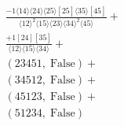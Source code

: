 \documentclass[varwidth, border=5pt]{standalone}
\begin{document}
\begin{my}
$\begin{gathered}
\scriptscriptstyle\frac{-1⟨14⟩⟨24⟩⟨25⟩[25]⟨35⟩[45]}{⟨12⟩^2⟨15⟩⟨23⟩⟨34⟩^2⟨45⟩}+\\
\scriptscriptstyle\frac{+1[24][35]}{⟨12⟩⟨15⟩⟨34⟩}+\\
\scriptscriptstyle(23451,\;\text{False})+\\
\scriptscriptstyle(34512,\;\text{False})+\\
\scriptscriptstyle(45123,\;\text{False})+\\
\scriptscriptstyle(51234,\;\text{False})\phantom{+}
\end{gathered}$
\end{my}
\end{document}
